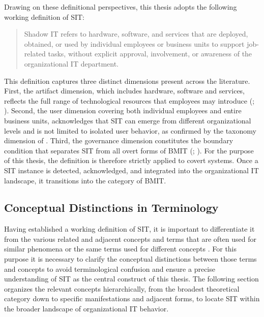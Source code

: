 \documentclass[12pt,oneside]{article}
\begin{document}
Drawing on these definitional perspectives, this thesis adopts the following working definition of \ac{SIT}:

\begin{quote}
  Shadow IT refers to hardware, software, and services that are deployed, obtained, or used by individual employees or business units to support job-related tasks, without explicit approval, involvement, or awareness of the organizational IT department.
\end{quote}

This definition captures three distinct dimensions present across the literature. First, the artifact dimension, which includes hardware, software and services, reflects the full range of technological resources that employees may introduce (\citealp[469]{haag2017shadow}; \citealp[4]{kaess2021towards}). Second, the user dimension covering both individual employees and entire business units, acknowledges that \ac{SIT} can emerge from different organizational levels and is not limited to isolated user behavior, as confirmed by the taxonomy dimension of \citet[3]{kopper2016towards}. Third, the governance dimension constitutes the boundary condition that separates \ac{SIT} from all overt forms of \ac{BMIT} (\citealp[3]{gyoery2012exploring}; \citealp[469, 470]{haag2017shadow}). For the purpose of this thesis, the definition is therefore strictly applied to covert systems. Once a \ac{SIT} instance is detected, acknowledged, and integrated into the organizational \ac{IT} landscape, it transitions into the category of \ac{BMIT}.

\subsection{Conceptual Distinctions in Terminology}

Having established a working definition of \ac{SIT}, it is important to differentiate it from the various related and adjacent concepts and terms that are often used for similar phenomena or the same terms used for different concepts \citep[1]{kopper2016towards}. For this purpose it is necessary to clarify the conceptual distinctions between those terms and concepts to avoid terminological confusion and ensure a precise understanding of \ac{SIT} as the central construct of this thesis. The following section organizes the relevant concepts hierarchically, from the broadest theoretical category down to specific manifestations and adjacent forms, to locate \ac{SIT} within the broader landscape of organizational \ac{IT} behavior. 
\end{document}
